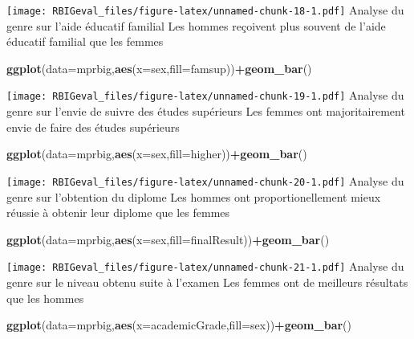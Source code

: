 \documentclass[
]{article}
\newenvironment{Shaded}{\begin{snugshade}}{\end{snugshade}}
\newcommand{\DataTypeTok}[1]{\textcolor[rgb]{0.13,0.29,0.53}{#1}}
\newcommand{\KeywordTok}[1]{\textcolor[rgb]{0.13,0.29,0.53}{\textbf{#1}}}
\newcommand{\NormalTok}[1]{#1}
\newcommand{\OperatorTok}[1]{\textcolor[rgb]{0.81,0.36,0.00}{\textbf{#1}}}
\begin{document}
\texttt{[image: RBIGeval\_files/figure-latex/unnamed-chunk-18-1.pdf]}
Analyse du genre sur l'aide éducatif familial Les hommes reçoivent plus
souvent de l'aide éducatif familial que les femmes

\begin{Shaded}
\begin{Highlighting}[]
\KeywordTok{ggplot}\NormalTok{(}\DataTypeTok{data=}\NormalTok{mprbig,}\KeywordTok{aes}\NormalTok{(}\DataTypeTok{x=}\NormalTok{sex,}\DataTypeTok{fill=}\NormalTok{famsup))}\OperatorTok{+}\KeywordTok{geom_bar}\NormalTok{()}
\end{Highlighting}
\end{Shaded}

\texttt{[image: RBIGeval\_files/figure-latex/unnamed-chunk-19-1.pdf]}
Analyse du genre sur l'envie de suivre des études supérieurs Les femmes
ont majoritairement envie de faire des études supérieurs

\begin{Shaded}
\begin{Highlighting}[]
\KeywordTok{ggplot}\NormalTok{(}\DataTypeTok{data=}\NormalTok{mprbig,}\KeywordTok{aes}\NormalTok{(}\DataTypeTok{x=}\NormalTok{sex,}\DataTypeTok{fill=}\NormalTok{higher))}\OperatorTok{+}\KeywordTok{geom_bar}\NormalTok{()}
\end{Highlighting}
\end{Shaded}

\texttt{[image: RBIGeval\_files/figure-latex/unnamed-chunk-20-1.pdf]}
Analyse du genre sur l'obtention du diplome Les hommes ont
proportionellement mieux réussie à obtenir leur diplome que les femmes

\begin{Shaded}
\begin{Highlighting}[]
\KeywordTok{ggplot}\NormalTok{(}\DataTypeTok{data=}\NormalTok{mprbig,}\KeywordTok{aes}\NormalTok{(}\DataTypeTok{x=}\NormalTok{sex,}\DataTypeTok{fill=}\NormalTok{finalResult))}\OperatorTok{+}\KeywordTok{geom_bar}\NormalTok{()}
\end{Highlighting}
\end{Shaded}

\texttt{[image: RBIGeval\_files/figure-latex/unnamed-chunk-21-1.pdf]}
Analyse du genre sur le niveau obtenu suite à l'examen Les femmes ont de
meilleurs résultats que les hommes

\begin{Shaded}
\begin{Highlighting}[]
\KeywordTok{ggplot}\NormalTok{(}\DataTypeTok{data=}\NormalTok{mprbig,}\KeywordTok{aes}\NormalTok{(}\DataTypeTok{x=}\NormalTok{academicGrade,}\DataTypeTok{fill=}\NormalTok{sex))}\OperatorTok{+}\KeywordTok{geom_bar}\NormalTok{()}
\end{Highlighting}
\end{Shaded}
\end{document}
